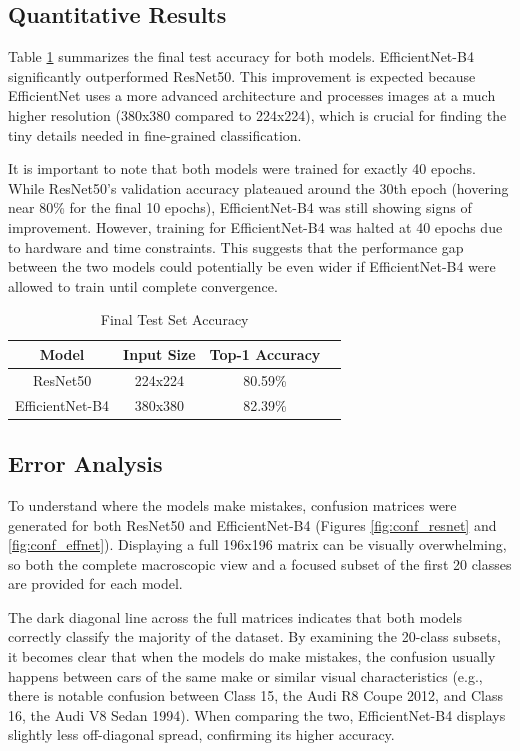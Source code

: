 \documentclass[conference]{IEEEtran}
\begin{document}
\subsection{Quantitative Results}
Table \ref{tab:results} summarizes the final test accuracy for both models. EfficientNet-B4 significantly outperformed ResNet50. This improvement is expected because EfficientNet uses a more advanced architecture and processes images at a much higher resolution (380x380 compared to 224x224), which is crucial for finding the tiny details needed in fine-grained classification.

It is important to note that both models were trained for exactly 40 epochs. While ResNet50's validation accuracy plateaued around the 30th epoch (hovering near 80\% for the final 10 epochs), EfficientNet-B4 was still showing signs of improvement. However, training for EfficientNet-B4 was halted at 40 epochs due to hardware and time constraints. This suggests that the performance gap between the two models could potentially be even wider if EfficientNet-B4 were allowed to train until complete convergence.

\begin{table}[htbp]
\caption{Final Test Set Accuracy}
\begin{center}
\begin{tabular}{|c|c|c|c|}
\hline
\textbf{Model} & \textbf{Input Size} & \textbf{Top-1 Accuracy} \\
\hline
ResNet50 & 224x224 & 80.59\% \\
\hline
EfficientNet-B4 & 380x380 & 82.39\% \\
\hline
\end{tabular}
\label{tab:results}
\end{center}
\end{table}

\subsection{Error Analysis}
To understand where the models make mistakes, confusion matrices were generated for both ResNet50 and EfficientNet-B4 (Figures \ref{fig:conf_resnet} and \ref{fig:conf_effnet}). Displaying a full 196x196 matrix can be visually overwhelming, so both the complete macroscopic view and a focused subset of the first 20 classes are provided for each model.

The dark diagonal line across the full matrices indicates that both models correctly classify the majority of the dataset. By examining the 20-class subsets, it becomes clear that when the models do make mistakes, the confusion usually happens between cars of the same make or similar visual characteristics (e.g., there is notable confusion between Class 15, the Audi R8 Coupe 2012, and Class 16, the Audi V8 Sedan 1994). When comparing the two, EfficientNet-B4 displays slightly less off-diagonal spread, confirming its higher accuracy.
\end{document}
